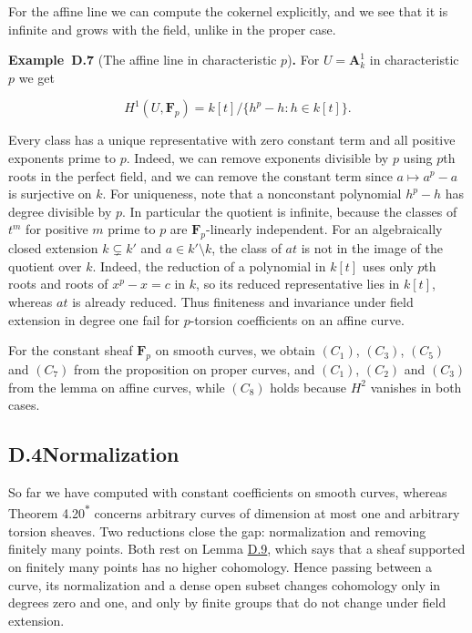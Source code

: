 \documentclass[11pt]{article}
\newenvironment{bpstatement}[2]{\par\addvspace{0.6\baselineskip}\noindent\textbf{#1}#2\textbf{.}\enspace\ignorespaces}
  {\par\addvspace{0.4\baselineskip}}
\newcommand{\bpout}[1]{#1\textsuperscript{\hyperlink{bp-outside}{\ensuremath{\ast}}}}
\begin{document}
\label{bp194}%
For the affine line we can compute the cokernel explicitly, and we see that it is infinite and grows with the field, unlike in the proper case.

\label{bp195}%
\begin{bpstatement}{Example~D.7}{ (The affine line in characteristic $p$)}
For \(U=\mathbf A^1_k\) in characteristic \(p\) we get

\[
H^1(U,\mathbf F_p)=k[t]/\{h^p-h:h\in k[t]\}.
\]

Every class has a unique representative with zero constant term and all positive exponents prime to \(p\).  Indeed, we can remove exponents divisible by \(p\) using \(p\)th roots in the perfect field, and we can remove the constant term since \(a\mapsto a^p-a\) is surjective on \(k\). For uniqueness, note that a nonconstant polynomial \(h^p-h\) has degree divisible by \(p\).  In particular the quotient is infinite, because the classes of \(t^m\) for positive \(m\) prime to \(p\) are \(\mathbf F_p\)-linearly independent.  For an algebraically closed extension \(k\subsetneq k'\) and \(a\in k'\setminus k\), the class of \(at\) is not in the image of the quotient over \(k\). Indeed, the reduction of a polynomial in \(k[t]\) uses only \(p\)th roots and roots of \(x^p-x=c\) in \(k\), so its reduced representative lies in \(k[t]\), whereas \(at\) is already reduced. Thus finiteness and invariance under field extension in degree one fail for \(p\)-torsion coefficients on an affine curve.
\end{bpstatement}

\label{bp196}%
For the constant sheaf \(\mathbf F_p\) on smooth curves, we obtain \((C_1)\), \((C_3)\), \((C_5)\) and \((C_7)\) from the proposition on proper curves, and \((C_1)\), \((C_2)\) and \((C_3)\) from the lemma on affine curves, while \((C_8)\) holds because \(H^2\) vanishes in both cases.


\subsection*{\texorpdfstring{D.4\quad Normalization}{D.4 Normalization}}
\label{bp197}%
\label{bp198}%
So far we have computed with constant coefficients on smooth curves, whereas Theorem \bpout{4.20} concerns arbitrary curves of dimension at most one and arbitrary torsion sheaves. Two reductions close the gap: normalization and removing finitely many points. Both rest on Lemma \hyperref[bp202]{D.9}, which says that a sheaf supported on finitely many points has no higher cohomology. Hence passing between a curve, its normalization and a dense open subset changes cohomology only in degrees zero and one, and only by finite groups that do not change under field extension.
\end{document}
